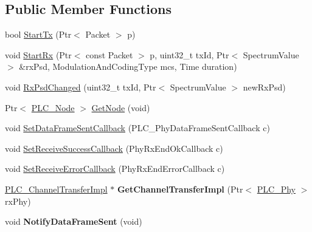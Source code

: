 \subsection*{\-Public \-Member \-Functions}
\begin{DoxyCompactItemize}
\item 
bool \hyperlink{classns3_1_1PLC__Phy_a4087fbae09bdb778285c0e7cdc307d2e}{\-Start\-Tx} (\-Ptr$<$ \-Packet $>$ p)
\item 
void \hyperlink{classns3_1_1PLC__Phy_aed817b59511d2c3455d75230d673ba7b}{\-Start\-Rx} (\-Ptr$<$ const \-Packet $>$ p, uint32\-\_\-t tx\-Id, \-Ptr$<$ \-Spectrum\-Value $>$ \&rx\-Psd, \-Modulation\-And\-Coding\-Type mcs, \-Time duration)
\item 
void \hyperlink{classns3_1_1PLC__Phy_a37c13147b5d5cb71843be91c1654fc18}{\-Rx\-Psd\-Changed} (uint32\-\_\-t tx\-Id, \-Ptr$<$ \-Spectrum\-Value $>$ new\-Rx\-Psd)
\item 
\-Ptr$<$ \hyperlink{classns3_1_1PLC__Node}{\-P\-L\-C\-\_\-\-Node} $>$ \hyperlink{classns3_1_1PLC__Phy_ac671d3c0e8fbe3792f4ee16e7f8998a2}{\-Get\-Node} (void)
\item 
void \hyperlink{classns3_1_1PLC__Phy_a970811df6124983c58f6b578a986f336}{\-Set\-Data\-Frame\-Sent\-Callback} (\-P\-L\-C\-\_\-\-Phy\-Data\-Frame\-Sent\-Callback c)
\item 
void \hyperlink{classns3_1_1PLC__Phy_abd23f344001a334bc6b2981e1f9e096d}{\-Set\-Receive\-Success\-Callback} (\-Phy\-Rx\-End\-Ok\-Callback c)
\item 
void \hyperlink{classns3_1_1PLC__Phy_a67ae8c7bf4a78a5788408f507b179bcc}{\-Set\-Receive\-Error\-Callback} (\-Phy\-Rx\-End\-Error\-Callback c)
\item 
\hypertarget{classns3_1_1PLC__Phy_a2901b7bc2979a2637c665c5501ef6d4a}{\hyperlink{classns3_1_1PLC__ChannelTransferImpl}{\-P\-L\-C\-\_\-\-Channel\-Transfer\-Impl} $\ast$ {\bfseries \-Get\-Channel\-Transfer\-Impl} (\-Ptr$<$ \hyperlink{classns3_1_1PLC__Phy}{\-P\-L\-C\-\_\-\-Phy} $>$ rx\-Phy)}\label{classns3_1_1PLC__Phy_a2901b7bc2979a2637c665c5501ef6d4a}

\item 
\hypertarget{classns3_1_1PLC__Phy_a51e432fe0945a6b810e0f5d240b2ff55}{void {\bfseries \-Notify\-Data\-Frame\-Sent} (void)}\label{classns3_1_1PLC__Phy_a51e432fe0945a6b810e0f5d240b2ff55}

\end{DoxyCompactItemize}
